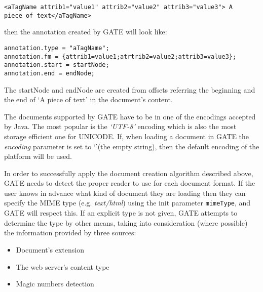\small
\begin{small}
\begin{verbatim}
<aTagName attrib1="value1" attrib2="value2" attrib3="value3"> A
piece of text</aTagName>
\end{verbatim}
\end{small}
\nnormalsize

then the annotation created by GATE will look like:

\small
\begin{small}
\begin{verbatim}
annotation.type = "aTagName";
annotation.fm = {attrib1=value1;atrtrib2=value2;attrib3=value3};
annotation.start = startNode;
annotation.end = endNode;
\end{verbatim}
\end{small}
\nnormalsize

The startNode and endNode are created from offsets referring the
beginning and the end of `A piece of text' in the document's
content.

The documents supported by GATE have to be in one of the encodings
accepted by Java. The most popular is the {\em `UTF-8'} encoding
which is also the most storage efficient one for UNICODE. If, when
loading a document in GATE the {\em encoding} parameter is set to
`'(the empty string), then the default encoding of the platform
will be used.



In order to successfully apply the document creation algorithm described above,
GATE needs to detect the proper reader to use for each document format.  If the
user knows in advance what kind of document they are loading then they can
specify the MIME type (e.g. {\em text/html}) using the init parameter
{\tt mimeType}, and GATE will respect this.  If an explicit type is not given,
GATE attempts to determine the type by other means, taking
into consideration (where possible) the information provided by three
sources:
\begin{itemize}
\item
Document's extension
\item
The web server's content type
\item
Magic numbers detection
\end{itemize}

